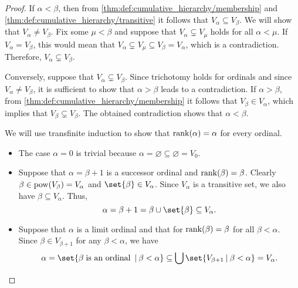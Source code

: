 \begin{proof}
   If \( \alpha < \beta \), then from \cref{thm:def:cumulative_hierarchy/membership} and \cref{thm:def:cumulative_hierarchy/transitive} it follows that \( V_\alpha \subseteq V_\beta \). We will show that \( V_\alpha \neq V_\beta \). Fix some \( \mu < \beta \) and suppose that \( V_\alpha \subsetneq V_\mu \) holds for all \( \alpha < \mu \). If \( V_\alpha = V_\beta \), this would mean that \( V_\alpha \subsetneq V_\mu \subseteq V_\beta = V_\alpha \), which is a contradiction. Therefore, \( V_\alpha \subsetneq V_\beta \).

  Conversely, suppose that \( V_\alpha \subsetneq V_\beta \). Since trichotomy holds for ordinals and since \( V_\alpha \neq V_\beta \), it is sufficient to show that \( \alpha > \beta \) leads to a contradiction. If \( \alpha > \beta \), from \cref{thm:def:cumulative_hierarchy/membership} it follows that \( V_\beta \in V_\alpha \), which implies that \( V_\beta \subsetneq V_\beta \). The obtained contradiction shows that \( \alpha < \beta \).

   We will use transfinite induction to show that \( \operatorname{rank}(\alpha) = \alpha \) for every ordinal.
  \begin{itemize}
    \item The case \( \alpha = 0 \) is trivial because \( \alpha = \varnothing \subseteq \varnothing = V_0 \).

    \item Suppose that \( \alpha = \beta + 1 \) is a successor ordinal and \( \operatorname{rank}(\beta) = \beta \). Clearly \( \beta \in \operatorname{pow}(V_\beta) = V_\alpha \) and \( \set{ \beta } \in V_\alpha \). Since \( V_\alpha \) is a transitive set, we also have \( \beta \subseteq V_\alpha \). Thus,
    \begin{equation*}
      \alpha = \beta + 1 = \beta \cup \set{ \beta } \subseteq V_\alpha.
    \end{equation*}

    \item Suppose that \( \alpha \) is a limit ordinal and that for \( \operatorname{rank}(\beta) = \beta \) for all \( \beta < \alpha \). Since \( \beta \in V_{\beta + 1} \) for any \( \beta < \alpha \), we have
    \begin{equation*}
      \alpha
      =
      \set{ \beta \T{is an ordinal} \given \beta < \alpha }
      \subseteq
      \bigcup\set{ V_{\beta + 1} \given \beta < \alpha }
      =
      V_\alpha.
    \end{equation*}
  \end{itemize}


\end{proof}
